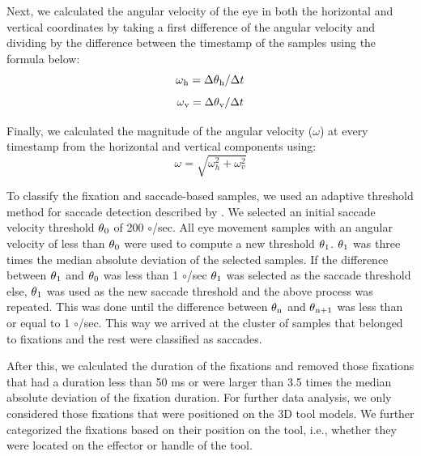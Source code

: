 Next, we calculated the angular velocity of the eye in both the horizontal and vertical coordinates by taking a first difference of the angular velocity and dividing by the difference between the timestamp of the samples using the formula below:
\begin{equation*}\label{eq:h_vel_angle}
    \omega\textsubscript{h} = \Delta\theta\textsubscript{h} / \Delta t
 \end{equation*}  
 \begin{equation*}\label{eq:v_vel_angle}
     \omega\textsubscript{v} = \Delta\theta\textsubscript{v} / \Delta t
 \end{equation*}  

Finally, we calculated the magnitude of the angular velocity ($\omega$) at every timestamp from the horizontal and vertical components using:
\begin{equation*}\label{eq:vel_angle}
     \omega = \sqrt{\omega_h^2 + \omega_v^2}
 \end{equation*}  

To classify the fixation and saccade-based samples, we used an adaptive threshold method for saccade detection described by \citet{Voloh2020-nz}.  We selected an initial saccade velocity threshold $\theta\textsubscript{0}$ of 200 $\circ$/sec. All eye movement samples with an angular velocity of less than $\theta\textsubscript{0}$ were used to compute a new threshold $\theta\textsubscript{1}$. $\theta\textsubscript{1}$ was three times the median absolute deviation of the selected samples. If the difference between $\theta\textsubscript{1}$ and $\theta\textsubscript{0}$ was less than 1 $\circ$/sec $\theta\textsubscript{1}$ was selected as the saccade threshold else, $\theta\textsubscript{1}$ was used as the new saccade threshold and the above process was repeated. This was done until the difference between $\theta\textsubscript{n}$ and $\theta\textsubscript{n+1}$ was less than or equal to 1 $\circ$/sec. This way we arrived at the cluster of samples that belonged to fixations and the rest were classified as saccades.

After this, we calculated the duration of the fixations and removed those fixations that had a duration less than 50 ms or were larger than 3.5 times the median absolute deviation of the fixation duration. For further data analysis, we only considered those fixations that were positioned on the 3D tool models. We further categorized the fixations based on their position on the tool, i.e., whether they were located on the effector or handle of the tool.


